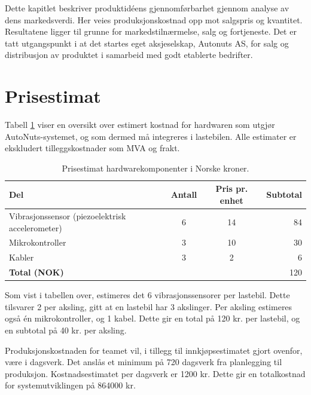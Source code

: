 Dette kapitlet beskriver produktidéens gjennomførbarhet gjennom analyse av 
dens markedsverdi. Her veies produksjonskostnad opp mot salgspris og kvantitet.
Resultatene ligger til grunne for markedstilnærmelse, salg og fortjeneste. Det er 
tatt utgangspunkt i at det startes eget aksjeselskap, Autonuts AS, for salg og distribusjon av produktet 
i samarbeid med godt etablerte bedrifter.

\section{Prisestimat}
Tabell \ref{tab:price-HW} viser en oversikt over estimert kostnad for 
hardwaren som utgjør AutoNuts-systemet, og som dermed må integreres i lastebilen. Alle estimater er ekskludert tilleggskostnader som MVA og frakt.
\newline
\begin{table}[H]
\caption{Prisestimat hardwarekomponenter i Norske kroner.}
\label{tab:price-HW}
\begin{tabularx}{\textwidth}{lcc|r}
	{\bf Del} & {\bf Antall} & {\bf Pris pr. enhet} & {\bf Subtotal}\\
	\hline
	Vibrasjonssensor (piezoelektrisk accelerometer) & 6 & 14 & 84\\
	Mikrokontroller & 3 & 10 & 30\\
	Kabler & 3 & 2 & 6\\
	\hline
	\multicolumn{3}{l}{{\bf Total (NOK)}} &\multicolumn{1}{r}{120}\\
	\hline \hline
\end{tabularx} 
\end{table}

Som vist i tabellen over, estimeres det 6 vibrasjonssensorer per lastebil. Dette
tilsvarer 2 per aksling, gitt at en lastebil har 3 akslinger. Per aksling 
estimeres også én mikrokontroller, og 1 kabel. Dette gir en 
total på 120 kr. per lastebil, og en subtotal på 40 kr. per aksling. \cite{PCBmail}

Produksjonskostnaden for teamet vil, i tillegg til innkjøpsestimatet gjort 
ovenfor, være i dagsverk. Det anslås et minimum på 720 dagsverk fra 
planlegging til produksjon. Kostnadsestimatet per dagsverk er 1200 kr. Dette gir en totalkostnad for systemutviklingen på 864000 kr.

